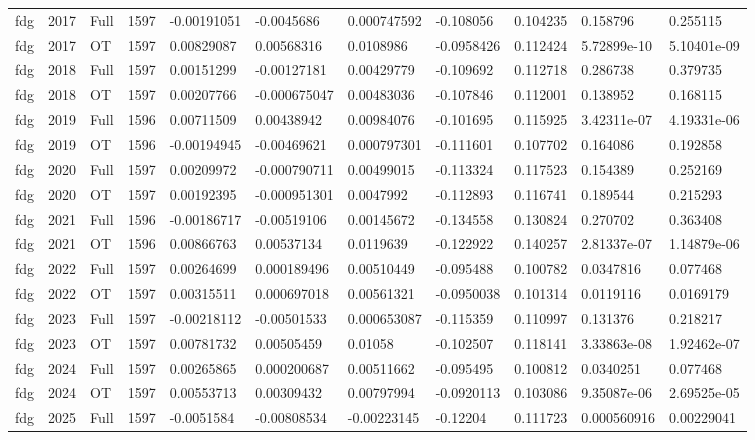 \begin{landscape}
\begin{longtable}{lllllllllll}
fdg & 2017 & Full & 1597 & -0.00191051 & -0.0045686 & 0.000747592 & -0.108056 & 0.104235 & 0.158796 & 0.255115 \\
fdg & 2017 & OT & 1597 & 0.00829087 & 0.00568316 & 0.0108986 & -0.0958426 & 0.112424 & 5.72899e-10 & 5.10401e-09 \\
fdg & 2018 & Full & 1597 & 0.00151299 & -0.00127181 & 0.00429779 & -0.109692 & 0.112718 & 0.286738 & 0.379735 \\
fdg & 2018 & OT & 1597 & 0.00207766 & -0.000675047 & 0.00483036 & -0.107846 & 0.112001 & 0.138952 & 0.168115 \\
fdg & 2019 & Full & 1596 & 0.00711509 & 0.00438942 & 0.00984076 & -0.101695 & 0.115925 & 3.42311e-07 & 4.19331e-06 \\
fdg & 2019 & OT & 1596 & -0.00194945 & -0.00469621 & 0.000797301 & -0.111601 & 0.107702 & 0.164086 & 0.192858 \\
fdg & 2020 & Full & 1597 & 0.00209972 & -0.000790711 & 0.00499015 & -0.113324 & 0.117523 & 0.154389 & 0.252169 \\
fdg & 2020 & OT & 1597 & 0.00192395 & -0.000951301 & 0.0047992 & -0.112893 & 0.116741 & 0.189544 & 0.215293 \\
fdg & 2021 & Full & 1596 & -0.00186717 & -0.00519106 & 0.00145672 & -0.134558 & 0.130824 & 0.270702 & 0.363408 \\
fdg & 2021 & OT & 1596 & 0.00866763 & 0.00537134 & 0.0119639 & -0.122922 & 0.140257 & 2.81337e-07 & 1.14879e-06 \\
fdg & 2022 & Full & 1597 & 0.00264699 & 0.000189496 & 0.00510449 & -0.095488 & 0.100782 & 0.0347816 & 0.077468 \\
fdg & 2022 & OT & 1597 & 0.00315511 & 0.000697018 & 0.00561321 & -0.0950038 & 0.101314 & 0.0119116 & 0.0169179 \\
fdg & 2023 & Full & 1597 & -0.00218112 & -0.00501533 & 0.000653087 & -0.115359 & 0.110997 & 0.131376 & 0.218217 \\
fdg & 2023 & OT & 1597 & 0.00781732 & 0.00505459 & 0.01058 & -0.102507 & 0.118141 & 3.33863e-08 & 1.92462e-07 \\
fdg & 2024 & Full & 1597 & 0.00265865 & 0.000200687 & 0.00511662 & -0.095495 & 0.100812 & 0.0340251 & 0.077468 \\
fdg & 2024 & OT & 1597 & 0.00553713 & 0.00309432 & 0.00797994 & -0.0920113 & 0.103086 & 9.35087e-06 & 2.69525e-05 \\
fdg & 2025 & Full & 1597 & -0.0051584 & -0.00808534 & -0.00223145 & -0.12204 & 0.111723 & 0.000560916 & 0.00229041 \\

\end{longtable}
\end{landscape}
